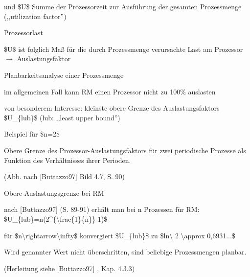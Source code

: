 \documentclass[a4paper]{article}
\begin{document}
\begin{multicols}{3}
\begin{itemize*}
\begin{itemize*}
            \item und \$U\$ Summe der Prozessorzeit zur Ausführung der gesamten Prozessmenge (,,utilization factor'')
        \end{itemize*}
        \item
        Prozessorlast
        \begin{itemize*}
            \item \$U\$ ist folglich Maß für die durch Prozessmenge verursachte Last am Prozessor $\rightarrow$  Auslastungsfaktor
        \end{itemize*}
        \item
        Planbarkeitsanalyse einer Prozessmenge
        \begin{itemize*}
            \item im allgemeinen Fall kann RM einen Prozessor nicht zu 100\% auslasten
            \item von besonderem Interesse: kleinste obere Grenze des Auslastungsfaktors \$U\_\{lub\}\$ (lub: ,,least upper bound'')
        \end{itemize*}
        \item
        Beispiel für \$n=2\$
        \begin{itemize*}
            \item Obere Grenze des Prozessor-Auslastungsfaktors für zwei periodische Prozesse als Funktion des Verhältnisses ihrer Perioden.
            \item (Abb. nach {[}Buttazzo97{]} Bild 4.7, S. 90)
        \end{itemize*}
        \item
        Obere Auslastungsgrenze bei RM
        \begin{itemize*}
            \item nach {[}Buttazzo97{]} (S. 89-91) erhält man bei n Prozessen für RM: \$U\_\{lub\}=n(2\^{}\{\textbackslash frac\{1\}\{n\}\}-1)\$
            \item für \$n\textbackslash rightarrow\textbackslash infty\$ konvergiert \$U\_\{lub\}\$ zu \$ln\textbackslash{} 2 \textbackslash approx 0,6931...\$
            \item Wird genannter Wert nicht überschritten, sind beliebige Prozessmengen planbar.
            \item (Herleitung siehe {[}Buttazzo97{]} , Kap. 4.3.3)
        \end{itemize*}
    \end{itemize*}



\end{multicols}
\end{document}
